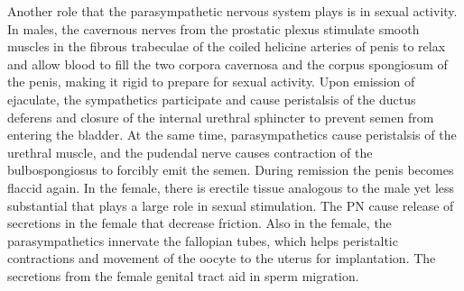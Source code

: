 Another role that the parasympathetic nervous system plays is in sexual activity. In males, the cavernous nerves from the prostatic plexus stimulate smooth muscles in the fibrous trabeculae of the coiled helicine arteries of penis to relax and allow blood to fill the two corpora cavernosa and the corpus spongiosum of the penis, making it rigid to prepare for sexual activity. Upon emission of ejaculate, the sympathetics participate and cause peristalsis of the ductus deferens and closure of the internal urethral sphincter to prevent semen from entering the bladder. At the same time, parasympathetics cause peristalsis of the urethral muscle, and the pudendal nerve causes contraction of the bulbospongiosus to forcibly emit the semen. During remission the penis becomes flaccid again. In the female, there is erectile tissue analogous to the male yet less substantial that plays a large role in sexual stimulation. The PN cause release of secretions in the female that decrease friction. Also in the female, the parasympathetics innervate the fallopian tubes, which helps peristaltic contractions and movement of the oocyte to the uterus for implantation. The secretions from the female genital tract aid in sperm migration.


